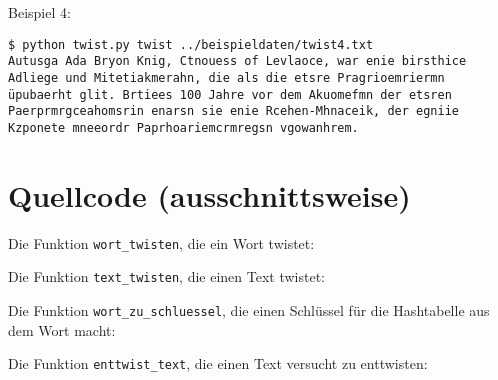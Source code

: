 \documentclass[a4paper,10pt,ngerman]{scrartcl}
\begin{document}
\vspace{10pt}
Beispiel 4:
\begin{lstlisting}[breaklines=true]
$ python twist.py twist ../beispieldaten/twist4.txt 
Autusga Ada Bryon Knig, Ctnouess of Levlaoce, war enie birsthice Adliege und Mitetiakmerahn, die als die etsre Pragrioemriermn üpubaerht glit. Brtiees 100 Jahre vor dem Akuomefmn der etsren Paerprmrgceahomsrin enarsn sie enie Rcehen-Mhnaceik, der egniie Kzponete mneeordr Paprhoariemcrmregsn vgowanhrem.
\end{lstlisting}


\section{Quellcode (ausschnittsweise)}

Die Funktion \texttt{wort\_twisten}, die ein Wort twistet:
 

\vspace{10pt}
Die Funktion \texttt{text\_twisten}, die einen Text twistet:


\vspace{10pt}
Die Funktion \texttt{wort\_zu\_schluessel}, die einen Schlüssel für die Hashtabelle aus dem Wort macht:


\vspace{10pt}
Die Funktion \texttt{enttwist\_text}, die einen Text versucht zu enttwisten:

\end{document}
